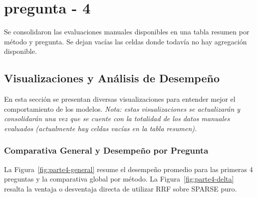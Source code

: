 \documentclass{article}
\renewcommand{\arraystretch}{1.15}
\begin{document}
\newpage
\section*{pregunta - 4}
Se consolidaron las evaluaciones manuales disponibles en una tabla resumen por método y pregunta. Se dejan vacías las celdas donde todavía no hay agregación disponible.

\begin{table}[h]
\centering
\small
\renewcommand{\arraystretch}{1.15}
\setlength{\tabcolsep}{6pt}
\caption{Resumen de evaluación manual por método y pregunta}
\label{tab:resumen-parte4}
\end{table}

\subsection*{Visualizaciones y Análisis de Desempeño}

En esta sección se presentan diversas visualizaciones para entender mejor el comportamiento de los modelos. \textit{Nota: estas visualizaciones se actualizarán y consolidarán una vez que se cuente con la totalidad de los datos manuales evaluados (actualmente hay celdas vacías en la tabla resumen).}

\subsubsection*{Comparativa General y Desempeño por Pregunta}
La Figura~\ref{fig:parte4-general} resume el desempeño promedio para las primeras 4 preguntas y la comparativa global por método. La Figura~\ref{fig:parte4-delta} resalta la ventaja o desventaja directa de utilizar RRF sobre SPARSE puro.
\end{document}
